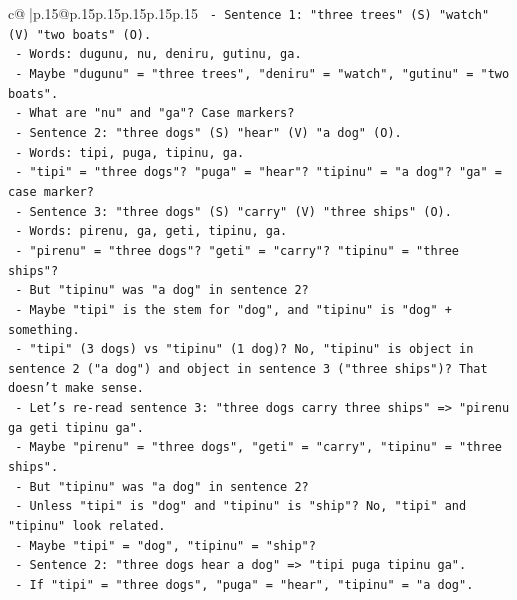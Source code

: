 \documentclass{article}
\begin{document}
{\begin{supertabular}{c@{$\;$}|p{.15\linewidth}@{}p{.15\linewidth}p{.15\linewidth}p{.15\linewidth}p{.15\linewidth}p{.15\linewidth}}
{{{\texttt{            {-} Sentence 1: "three trees" (S) "watch" (V) "two boats" (O).} \\
\texttt{              {-} Words: dugunu, nu, deniru, gutinu, ga.} \\
\texttt{              {-} Maybe "dugunu" = "three trees", "deniru" = "watch", "gutinu" = "two boats".} \\
\texttt{              {-} What are "nu" and "ga"? Case markers?} \\
\texttt{            {-} Sentence 2: "three dogs" (S) "hear" (V) "a dog" (O).} \\
\texttt{              {-} Words: tipi, puga, tipinu, ga.} \\
\texttt{              {-} "tipi" = "three dogs"? "puga" = "hear"? "tipinu" = "a dog"? "ga" = case marker?} \\
\texttt{            {-} Sentence 3: "three dogs" (S) "carry" (V) "three ships" (O).} \\
\texttt{              {-} Words: pirenu, ga, geti, tipinu, ga.} \\
\texttt{              {-} "pirenu" = "three dogs"? "geti" = "carry"? "tipinu" = "three ships"?} \\
\texttt{              {-} But "tipinu" was "a dog" in sentence 2?} \\
\texttt{              {-} Maybe "tipi" is the stem for "dog", and "tipinu" is "dog" + something.} \\
\texttt{              {-} "tipi" (3 dogs) vs "tipinu" (1 dog)? No, "tipinu" is object in sentence 2 ("a dog") and object in sentence 3 ("three ships")? That doesn't make sense.} \\
\texttt{              {-} Let's re{-}read sentence 3: "three dogs carry three ships" => "pirenu ga geti tipinu ga".} \\
\texttt{                {-} Maybe "pirenu" = "three dogs", "geti" = "carry", "tipinu" = "three ships".} \\
\texttt{                {-} But "tipinu" was "a dog" in sentence 2?} \\
\texttt{                {-} Unless "tipi" is "dog" and "tipinu" is "ship"? No, "tipi" and "tipinu" look related.} \\
\texttt{                {-} Maybe "tipi" = "dog", "tipinu" = "ship"?} \\
\texttt{                {-} Sentence 2: "three dogs hear a dog" => "tipi puga tipinu ga".} \\
\texttt{                  {-} If "tipi" = "three dogs", "puga" = "hear", "tipinu" = "a dog".} \\
}}}
\end{supertabular}}
\end{document}
